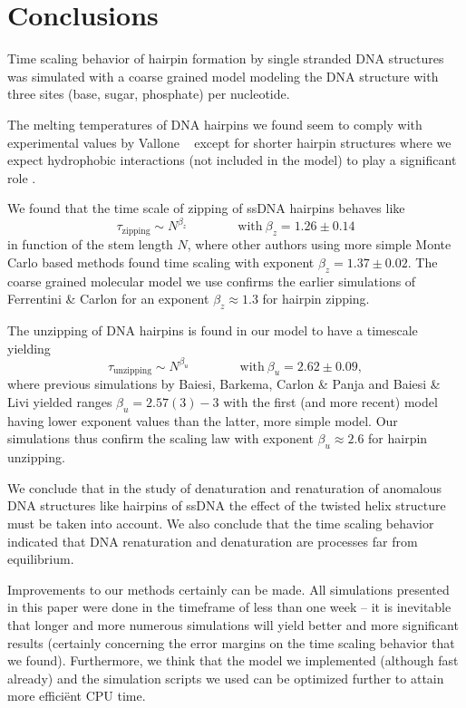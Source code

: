 \section{Conclusions}

Time scaling behavior of hairpin formation by single stranded DNA structures was simulated with a coarse grained model modeling the DNA structure with three sites (base, sugar, phosphate) per nucleotide.

The melting temperatures of DNA hairpins we found seem to comply with experimental values by Vallone \etal\ \cite{vallone1999melting} except for shorter hairpin structures where we expect hydrophobic interactions (not included in the model) to play a significant role \cite{kuznetsov2001semiflexible}.

We found that the time scale of zipping of ssDNA hairpins behaves like
\begin{equation}
\tau_\text{zipping} \sim N^{\beta_z} \qquad \qquad \text{with}\ \beta_z = 1.26\pm0.14
\end{equation}
in function of the stem length $N$, where other authors using more simple Monte Carlo based methods found time scaling with exponent $\beta_z = 1.37 \pm 0.02$. The coarse grained molecular model we use confirms the earlier simulations of Ferrentini \& Carlon \cite{carlon2011anomalous} for an exponent $\beta_z \approx 1.3$ for hairpin zipping.

The unzipping of DNA hairpins is found in our model to have a timescale yielding
\begin{equation}
\tau_\text{unzipping} \sim N^{\beta_u} \qquad \qquad \text{with}\ \beta_u = 2.62\pm0.09,
\end{equation}
where previous simulations by Baiesi, Barkema, Carlon \& Panja \cite{carlon2010unwinding} and Baiesi \& Livi \cite{baiesi2009multiple} yielded ranges $\beta_u = 2.57(3) - 3$ with the first (and more recent) model having lower exponent values than the latter, more simple model. Our simulations thus confirm the scaling law with exponent $\beta_u \approx 2.6$ for hairpin unzipping.

We conclude that in the study of denaturation and renaturation of anomalous DNA structures like hairpins of ssDNA the effect of the twisted helix structure must be taken into account. We also conclude that the time scaling behavior indicated that DNA renaturation and denaturation are processes far from equilibrium.

Improvements to our methods certainly can be made. All simulations presented in this paper were done in the timeframe of less than one week -- it is inevitable that longer and more numerous simulations will yield better and more significant results (certainly concerning the error margins on the time scaling behavior that we found). Furthermore, we think that the model we implemented (although fast already) and the simulation scripts we used can be optimized further to attain more effici\"ent CPU time.